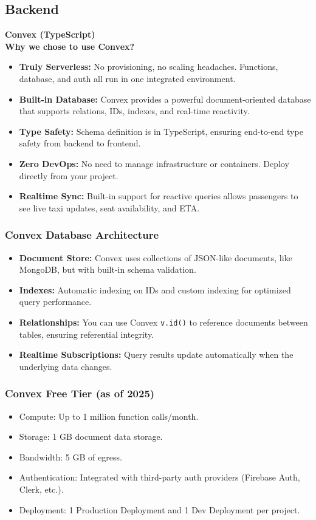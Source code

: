 \documentclass[a4paper,12pt]{article}
\begin{document}
\subsection{Backend}
\textbf{Convex (TypeScript)}\\
\textbf{Why we chose to use Convex?}
\begin{itemize}
    \item \textbf{Truly Serverless:} No provisioning, no scaling headaches. Functions, database, and auth all run in one integrated environment.
    \item \textbf{Built-in Database:} Convex provides a powerful document-oriented database that supports relations, IDs, indexes, and real-time reactivity.
    \item \textbf{Type Safety:} Schema definition is in TypeScript, ensuring end-to-end type safety from backend to frontend.
    \item \textbf{Zero DevOps:} No need to manage infrastructure or containers. Deploy directly from your project.
    \item \textbf{Realtime Sync:} Built-in support for reactive queries allows passengers to see live taxi updates, seat availability, and ETA.
\end{itemize}

\subsubsection*{Convex Database Architecture}
\begin{itemize}
    \item \textbf{Document Store:} Convex uses collections of JSON-like documents, like MongoDB, but with built-in schema validation.
    \item \textbf{Indexes:} Automatic indexing on IDs and custom indexing for optimized query performance.
    \item \textbf{Relationships:} You can use Convex \texttt{v.id()} to reference documents between tables, ensuring referential integrity.
    \item \textbf{Realtime Subscriptions:} Query results update automatically when the underlying data changes.
\end{itemize}

\subsubsection*{Convex Free Tier (as of 2025)}
\begin{itemize}
    \item Compute: Up to 1 million function calls/month.
    \item Storage: 1 GB document data storage.
    \item Bandwidth: 5 GB of egress.
    \item Authentication: Integrated with third-party auth providers (Firebase Auth, Clerk, etc.).
    \item Deployment: 1 Production Deployment and 1 Dev Deployment per project.
\end{itemize}
\end{document}
